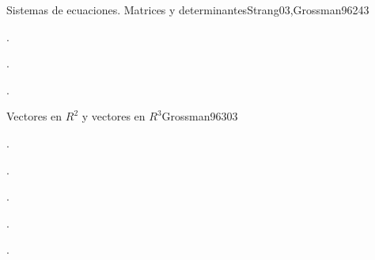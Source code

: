 \begin{syllabus}
\begin{unit}{}{Sistemas de ecuaciones. Matrices y determinantes}{Strang03,Grossman96}{24}{3}
   \begin{learningoutcomes}
      \item .
      \item .
      \item .
     
   \end{learningoutcomes}
\end{unit}

\begin{unit}{}{Vectores en $R^2$ y vectores en $R^3$}{Grossman96}{30}{3}
   \begin{topics}
      \item .
      \item .
   \end{topics}

   \begin{learningoutcomes}
      \item .
      \item .
      \item .
   \end{learningoutcomes}
\end{unit}



\begin{coursebibliography}
\end{coursebibliography}

\end{syllabus}
